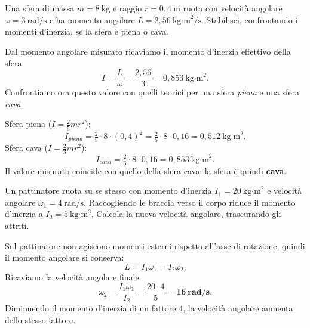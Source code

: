 
\begin{question}[ID=2.5, subtitle={Determinare se una sfera è piena o cava dal momento angolare}, tags={corpo rigido, momento angolare, sfera}, difficulty=media]
Una sfera di massa $m = 8\ \text{kg}$ e raggio $r = 0{,}4\ \text{m}$ ruota con velocità angolare $\omega = 3\ \text{rad/s}$ e ha momento angolare $L = 2{,}56\ \text{kg·m}^2/\text{s}$. Stabilisci, confrontando i momenti d'inerzia, se la sfera è piena o cava.
\begin{solution}
Dal momento angolare misurato ricaviamo il momento d'inerzia effettivo della sfera:
\[
I = \frac{L}{\omega} = \frac{2{,}56}{3} = 0{,}853\ \text{kg·m}^2.
\]
Confrontiamo ora questo valore con quelli teorici per una sfera \emph{piena} e una sfera \emph{cava}.

\noindent Sfera piena ($I = \tfrac{2}{5}mr^2$):
\[
I_{piena} = \tfrac{2}{5}\cdot 8\cdot (0{,}4)^2 = \tfrac{2}{5}\cdot 8\cdot 0{,}16 = 0{,}512\ \text{kg·m}^2.
\]
Sfera cava ($I = \tfrac{2}{3}mr^2$):
\[
I_{cava} = \tfrac{2}{3}\cdot 8\cdot 0{,}16 = 0{,}853\ \text{kg·m}^2.
\]
Il valore misurato coincide con quello della sfera cava: la sfera è quindi \textbf{cava}.
\end{solution}
\end{question}


\begin{question}[ID=3.1, subtitle={Pattinatore che raccoglie le braccia — conservazione di L}, tags={corpo rigido, conservazione momento angolare}, difficulty=facile]
Un pattinatore ruota su se stesso con momento d'inerzia $I_1 = 20\ \text{kg·m}^2$ e velocità angolare $\omega_1 = 4\ \text{rad/s}$. Raccogliendo le braccia verso il corpo riduce il momento d'inerzia a $I_2 = 5\ \text{kg·m}^2$. Calcola la nuova velocità angolare, trascurando gli attriti.
\begin{solution}
Sul pattinatore non agiscono momenti esterni rispetto all'asse di rotazione, quindi il momento angolare si conserva:
\[
L = I_1 \omega_1 = I_2 \omega_2.
\]
Ricaviamo la velocità angolare finale:
\[
\omega_2 = \frac{I_1 \omega_1}{I_2} = \frac{20\cdot 4}{5} = \mathbf{16\ \text{rad/s}}.
\]
Diminuendo il momento d'inerzia di un fattore $4$, la velocità angolare aumenta dello stesso fattore.
\end{solution}
\end{question}

